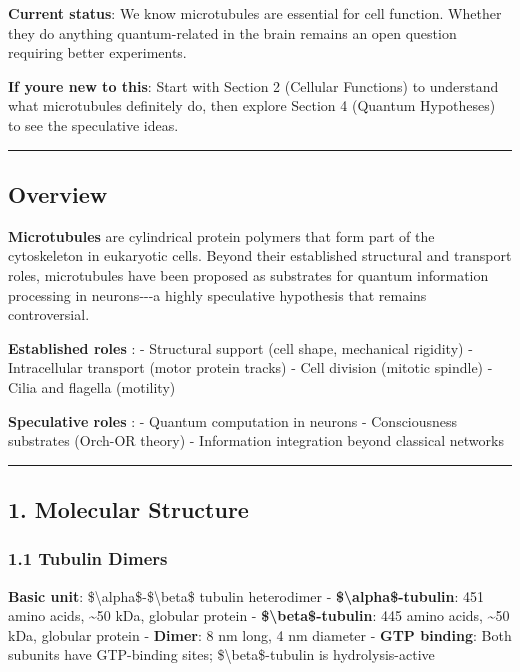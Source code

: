 \textbf{Current status}: We know microtubules are essential for cell
function. Whether they do anything quantum-related in the brain remains
an open question requiring better experiments.

\textbf{If you\textquotesingle re new to this}: Start with Section 2
(Cellular Functions) to understand what microtubules definitely do, then
explore Section 4 (Quantum Hypotheses) to see the speculative ideas.

\begin{center}\rule{0.5\linewidth}{0.5pt}\end{center}

\subsection{Overview}\label{overview}

\textbf{Microtubules} are cylindrical protein polymers that form part of
the cytoskeleton in eukaryotic cells. Beyond their established
structural and transport roles, microtubules have been proposed as
substrates for quantum information processing in neurons-\/-\/-a highly
speculative hypothesis that remains controversial.

\textbf{Established roles} : - Structural support (cell shape,
mechanical rigidity) - Intracellular transport (motor protein tracks) -
Cell division (mitotic spindle) - Cilia and flagella (motility)

\textbf{Speculative roles} : - Quantum computation in neurons -
Consciousness substrates (Orch-OR theory) - Information integration
beyond classical networks

\begin{center}\rule{0.5\linewidth}{0.5pt}\end{center}

\subsection{1. Molecular Structure}\label{molecular-structure}

\subsubsection{1.1 Tubulin Dimers}\label{tubulin-dimers}

\textbf{Basic unit}: \$\textbackslash alpha\$-\$\textbackslash beta\$
tubulin heterodimer - \textbf{\$\textbackslash alpha\$-tubulin}: 451
amino acids, \textasciitilde50 kDa, globular protein -
\textbf{\$\textbackslash beta\$-tubulin}: 445 amino acids,
\textasciitilde50 kDa, globular protein - \textbf{Dimer}: 8 nm long, 4
nm diameter - \textbf{GTP binding}: Both subunits have GTP-binding
sites; \$\textbackslash beta\$-tubulin is hydrolysis-active

